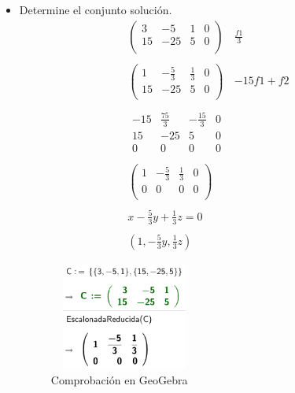 \begin{itemize}
    \item Determine el conjunto solución.
    \[
        \begin{aligned}
            \left(
                \begin{array}{ccc|c}
                    3 & -5 & 1 & 0 \\
                    15 & -25 & 5 & 0 \\
                \end{array}
            \right)
            &\frac{f1}{3} \\ \\
            \left(
                \begin{array}{ccc|c}
                    1 & -\frac{5}{3} & \frac{1}{3} & 0 \\
                    15 & -25 & 5 & 0 \\
                \end{array}
            \right)
            &-15f1+f2 \\ \\
            \begin{array}{ccc|c}
                -15 & \frac{75}{3} & -\frac{15}{3} & 0 \\
                15 & -25 & 5 & 0 \\
                \hline
                0 & 0 & 0 & 0
            \end{array} \\ \\
            \left(
                \begin{array}{ccc|c}
                    1 & -\frac{5}{3} & \frac{1}{3} & 0 \\
                    0 & 0 & 0 & 0 \\
                \end{array}
            \right) \\ \\
            x-\frac{5}{3}y+\frac{1}{3}z=0 \\ \\
            \left(
                1,-\frac{5}{3}y,\frac{1}{3}z
            \right)
        \end{aligned}
    \]
    \begin{figure}[ht!]
        \centering
        \includegraphics[width=140pt,height=100pt]{img/imagen13.png}
        \caption{Comprobación en GeoGebra}
    \end{figure}


\end{itemize}

